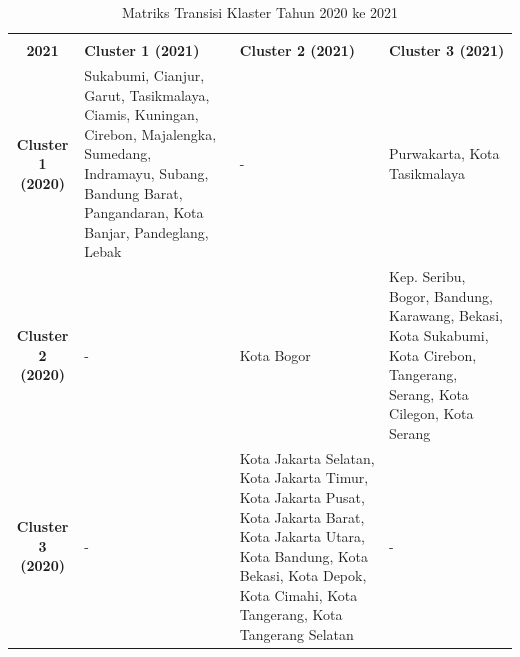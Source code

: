 \begin{table}[H]
\centering
\caption{Matriks Transisi Klaster Tahun 2020 ke 2021} \label{tab:transisi_2020_2021}
\begin{tabular}{|c|p{2cm}|p{2cm}|p{2cm}|}
\hline
\makecell{\textbf{Tahun 2020} \\ \textbf{2021}} & \textbf{Cluster 1 (2021)} & \textbf{Cluster 2 (2021)} & \textbf{Cluster 3 (2021)} \\ \hline
\textbf{Cluster 1 (2020)} & Sukabumi, Cianjur, Garut, Tasikmalaya, Ciamis, Kuningan, Cirebon, Majalengka, Sumedang, Indramayu, Subang, Bandung Barat, Pangandaran, Kota Banjar, Pandeglang, Lebak & - & Purwakarta, Kota Tasikmalaya \\ \hline
\textbf{Cluster 2 (2020)} & - & Kota Bogor & Kep. Seribu, Bogor, Bandung, Karawang, Bekasi, Kota Sukabumi, Kota Cirebon, Tangerang, Serang, Kota Cilegon, Kota Serang \\ \hline
\textbf{Cluster 3 (2020)} & - & Kota Jakarta Selatan, Kota Jakarta Timur, Kota Jakarta Pusat, Kota Jakarta Barat, Kota Jakarta Utara, Kota Bandung, Kota Bekasi, Kota Depok, Kota Cimahi, Kota Tangerang, Kota Tangerang Selatan & - \\ \hline
\end{tabular}
\end{table}